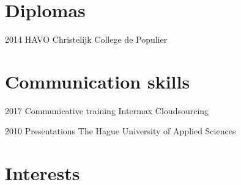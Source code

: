 \documentclass[]{friggeri-cv}
\begin{document}

\section{Diplomas}

\begin{entrylist}


\entry
{2014}
{HAVO}
{Christelijk College de Populier}


\end{entrylist}


\section{Communication skills}

\begin{entrylist}


\entry
{2017}
{Communicative training}
{Intermax Cloudsourcing}


\entry
{2010}
{Presentations}
{The Hague University of Applied Sciences}


\end{entrylist}


\section{Interests}
\end{document}
